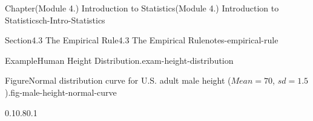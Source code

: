 \documentclass[oneside,10pt,]{book}
\begin{document}
\begin{chapterptx}{Chapter}{(Module 4.) Introduction to Statistics}{}{(Module 4.) Introduction to Statistics}{}{}{ch-Intro-Statistics}
\begin{sectionptx}{Section}{4.3 The Empirical Rule}{}{4.3 The Empirical Rule}{}{}{notes-empirical-rule}
\begin{example}{Example}{Human Height Distribution.}{exam-height-distribution}
\begin{figureptx}{Figure}{Normal distribution curve for U.S. adult male height (\(Mean = 70\), \(sd = 1.5\)).}{fig-male-height-normal-curve}{}%
\begin{image}{0.1}{0.8}{0.1}{}%
\end{image}
\end{figureptx}
\end{example}
\end{sectionptx}
\end{chapterptx}
\end{document}
